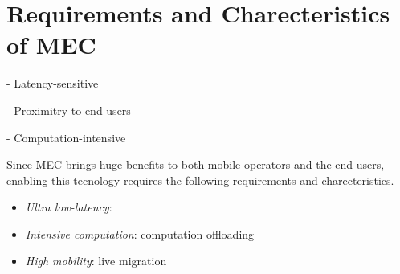 \section{Requirements and Charecteristics of MEC}  \label{requirements}

- Latency-sensitive

- Proximitry to end users

- Computation-intensive

Since MEC brings huge benefits to both mobile operators and the end users, enabling this tecnology requires the following requirements and charecteristics.

\begin{itemize}

\item \textit{\textit{Ultra low-latency}}:

\item \textit{\textit{Intensive computation}}: computation offloading

\item \textit{\textit{High mobility}}: live migration

\end{itemize}
